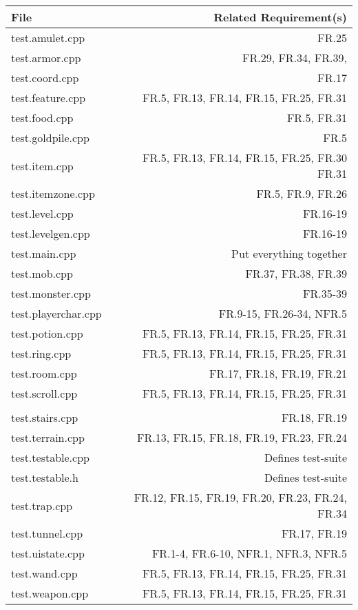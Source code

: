 \documentclass[12pt, titlepage]{article}
\begin{document}
	\begin{table}[h!]
		\caption{\bf Test-Requirement Trace}
		\label{TblMH}
		\bigskip
		\centering
		\begin{longtable}{lr}
			\hline
			File & Related Requirement(s)\\
			\hline
			test.amulet.cpp 		& FR.25\\
			test.armor.cpp 			& FR.29, FR.34, FR.39,\\
			test.coord.cpp 			& FR.17\\
			test.feature.cpp 		& FR.5, FR.13, FR.14, FR.15, FR.25, FR.31\\
			test.food.cpp 			& FR.5, FR.31\\
			test.goldpile.cpp 		& FR.5\\
			test.item.cpp 			& FR.5, FR.13, FR.14, FR.15, FR.25, FR.30 FR.31\\
			test.itemzone.cpp 		& FR.5, FR.9, FR.26\\
			test.level.cpp 			& FR.16-19\\
			test.levelgen.cpp 		& FR.16-19\\
			test.main.cpp 			& Put everything together\\
			test.mob.cpp 			& FR.37, FR.38, FR.39\\
			test.monster.cpp 		& FR.35-39\\
			test.playerchar.cpp 	& FR.9-15, FR.26-34, NFR.5\\
			test.potion.cpp 		& FR.5, FR.13, FR.14, FR.15, FR.25, FR.31\\
			test.ring.cpp 			& FR.5, FR.13, FR.14, FR.15, FR.25, FR.31\\
			test.room.cpp 			& FR.17, FR.18, FR.19, FR.21\\
			test.scroll.cpp 		& FR.5, FR.13, FR.14, FR.15, FR.25, FR.31\\\\
			test.stairs.cpp 		& FR.18, FR.19\\
			test.terrain.cpp 		& FR.13, FR.15, FR.18, FR.19, FR.23, FR.24\\
			test.testable.cpp 		& Defines test-suite\\
			test.testable.h 		& Defines test-suite\\
			test.trap.cpp 			& FR.12, FR.15, FR.19, FR.20, FR.23, FR.24, FR.34\\
			test.tunnel.cpp 		& FR.17, FR.19\\
			test.uistate.cpp 		& FR.1-4, FR.6-10, NFR.1, NFR.3, NFR.5\\
			test.wand.cpp 			& FR.5, FR.13, FR.14, FR.15, FR.25, FR.31\\
			test.weapon.cpp 		& FR.5, FR.13, FR.14, FR.15, FR.25, FR.31\\
			\hline
		\end{longtable}
	\end{table}
\end{document}
